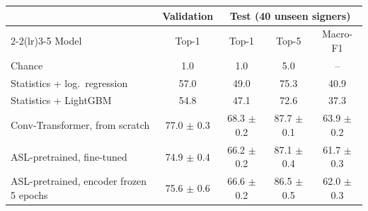 \begin{tabular}{lcccc}
\toprule
 & Validation & \multicolumn{3}{c}{Test (40 unseen signers)} \\
\cmidrule(lr){2-2}\cmidrule(lr){3-5}
Model & Top-1 & Top-1 & Top-5 & Macro-F1 \\
\midrule
Chance & 1.0 & 1.0 & 5.0 & -- \\
Statistics + log.\ regression & 57.0 & 49.0 & 75.3 & 40.9 \\
Statistics + LightGBM & 54.8 & 47.1 & 72.6 & 37.3 \\
\midrule
Conv-Transformer, from scratch & 77.0 $\pm$ 0.3 & 68.3 $\pm$ 0.2 & 87.7 $\pm$ 0.1 & 63.9 $\pm$ 0.2 \\
\quad ASL-pretrained, fine-tuned & 74.9 $\pm$ 0.4 & 66.2 $\pm$ 0.2 & 87.1 $\pm$ 0.4 & 61.7 $\pm$ 0.3 \\
\quad ASL-pretrained, encoder frozen 5 epochs & 75.6 $\pm$ 0.6 & 66.6 $\pm$ 0.2 & 86.5 $\pm$ 0.5 & 62.0 $\pm$ 0.3 \\
\bottomrule
\end{tabular}

